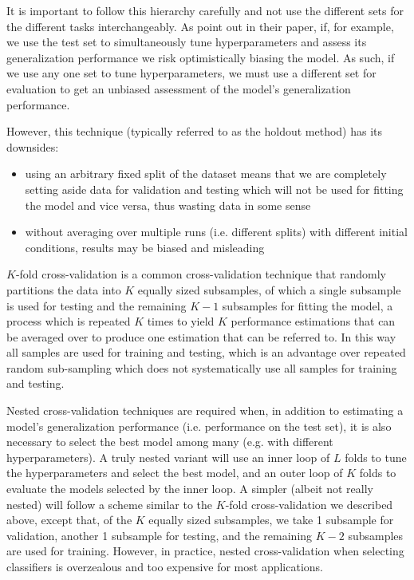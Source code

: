 It is important to follow this hierarchy carefully and not use the different sets for the different tasks interchangeably. As \citeauthor{crossvalidationbias} point out in their \citeyear{crossvalidationbias} paper, if, for example, we use the test set to simultaneously tune hyperparameters and assess its generalization performance we risk optimistically biasing the model. As such, if we use any one set to tune hyperparameters, we must use a different set for evaluation to get an unbiased assessment of the model's generalization performance.

However, this technique (typically referred to as the holdout method) has its downsides:

\begin{itemize}
    \item using an arbitrary fixed split of the dataset means that we are completely setting aside data for validation and testing which will not be used for fitting the model and vice versa, thus wasting data in some sense
    \item without averaging over multiple runs (i.e. different splits) with different initial conditions, results may be biased and misleading
\end{itemize}

$K$-fold cross-validation is a common cross-validation technique that randomly partitions the data into $K$ equally sized subsamples, of which a single subsample is used for testing and the remaining $K-1$ subsamples for fitting the model, a process which is repeated $K$ times to yield $K$ performance estimations that can be averaged over to produce one estimation that can be referred to. In this way all samples are used for training and testing, which is an advantage over repeated random sub-sampling which does not systematically use all samples for training and testing.

Nested cross-validation techniques are required when, in addition to estimating a model's generalization performance (i.e. performance on the test set), it is also necessary to select the best model among many (e.g. with different hyperparameters)\cite{crossvalidationbias}. A truly nested variant will use an inner loop of $L$ folds to tune the hyperparameters and select the best model, and an outer loop of $K$ folds to evaluate the models selected by the inner loop. A simpler (albeit not really nested) will follow a scheme similar to the $K$-fold cross-validation we described above, except that, of the $K$ equally sized subsamples, we take 1 subsample for validation, another 1 subsample for testing, and the remaining $K-2$ subsamples are used for training. However, in practice, nested cross-validation when selecting classifiers is overzealous and too expensive for most applications\cite{nestedcvoverzealous}.

